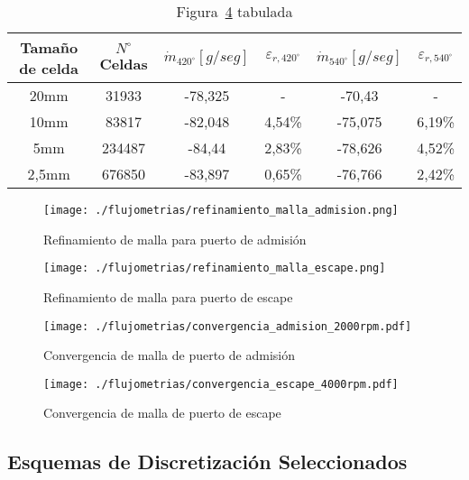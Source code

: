 \begin{table}
  \centering
  \begin{tabular}{cccccc}\toprule
    Tamaño de celda & $N^{\circ}$ Celdas & $\dot{m}_{420^{\circ}} [g/seg]$ & $\varepsilon_{r,420^{\circ}}$ & $\dot{m}_{540^{\circ}} [g/seg]$ & $\varepsilon_{r,540^{\circ}}$ \\ \midrule
    20mm  & 31933  & -78,325 & - & -70,43 & - \\
    10mm  & 83817  & -82,048 & 4,54\% & -75,075 & 6,19\% \\
    5mm   & 234487 & -84,44  & 2,83\% & -78,626 & 4,52\% \\
    2,5mm & 676850 & -83,897 & 0,65\% & -76,766 & 2,42\% \\ \bottomrule
  \end{tabular}
  \caption{Figura~\ref{fig:conv_malla_escape} tabulada}\label{tab:convergencia_malla_escape}
\end{table}

\begin{figure}
  \centering
  \texttt{[image: ./flujometrias/refinamiento\_malla\_admision.png]}
  \caption{Refinamiento de malla para puerto de admisión}\label{fig:refinamiento_admision}
\end{figure}

\begin{figure}
  \centering
  \texttt{[image: ./flujometrias/refinamiento\_malla\_escape.png]}
  \caption{Refinamiento de malla para puerto de escape}\label{fig:refinamiento_escape}
\end{figure}

\begin{figure}
  \centering
  \texttt{[image: ./flujometrias/convergencia\_admision\_2000rpm.pdf]}
  \caption{Convergencia de malla de puerto de admisión}\label{fig:conv_malla_admision}
\end{figure}

\begin{figure}
  \centering
  \texttt{[image: ./flujometrias/convergencia\_escape\_4000rpm.pdf]}
  \caption{Convergencia de malla de puerto de escape}\label{fig:conv_malla_escape}
\end{figure}



\subsection{Esquemas de Discretización Seleccionados}

